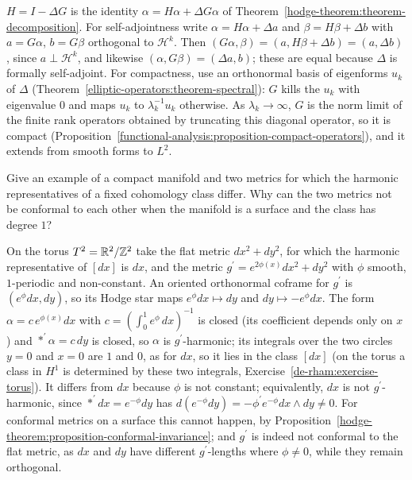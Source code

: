 \begin{solution}
$H = I - \Delta G$ is the identity $\alpha = H\alpha + \Delta G\alpha$ of Theorem~\ref{hodge-theorem:theorem-decomposition}. For self-adjointness write $\alpha = H\alpha + \Delta a$ and $\beta = H\beta + \Delta b$
with $a = G\alpha$, $b = G\beta$ orthogonal to $\mathcal{H}^k$. Then $(G\alpha, \beta) = (a, H\beta + \Delta b) = (a, \Delta b)$, since $a \perp \mathcal{H}^k$, and likewise $(\alpha, G\beta) = (\Delta a, b)$; these are equal because
$\Delta$ is formally self-adjoint. For compactness, use an orthonormal basis of eigenforms $u_k$ of $\Delta$ (Theorem~\ref{elliptic-operators:theorem-spectral}): $G$ kills the $u_k$ with eigenvalue $0$ and maps
$u_k$ to $\lambda_k^{-1}u_k$ otherwise. As $\lambda_k \to \infty$, $G$ is the norm limit of the finite rank operators obtained by truncating this diagonal operator, so it is compact
(Proposition~\ref{functional-analysis:proposition-compact-operators}), and it extends from smooth forms to $L^2$.
\end{solution}

\begin{exercise}\label{hodge-theorem:exercise-harmonic-not-metric-independent}
Give an example of a compact manifold and two metrics for which the harmonic representatives of a fixed cohomology class differ. Why can the two metrics not be conformal to each other when the
manifold is a surface and the class has degree $1$?
\end{exercise}

\begin{solution}
On the torus $T^2 = \mathbb{R}^2/\mathbb{Z}^2$ take the flat metric $dx^2 + dy^2$, for which the harmonic representative of $[dx]$ is $dx$, and the metric $g^{\prime} = e^{2\phi(x)}dx^2 + dy^2$ with $\phi$ smooth,
$1$-periodic and non-constant. An oriented orthonormal coframe for $g^{\prime}$ is $(e^\phi dx, dy)$, so its Hodge star maps $e^\phi dx \mapsto dy$ and $dy \mapsto -e^\phi dx$. The form
$\alpha = c\,e^{\phi(x)}dx$ with $c = (\int_0^1e^\phi\,dx)^{-1}$ is closed (its coefficient depends only on $x$) and $*^{\prime}\alpha = c\,dy$ is closed, so $\alpha$ is $g^{\prime}$-harmonic; its integrals over the
two circles $y = 0$ and $x = 0$ are $1$ and $0$, as for $dx$, so it lies in the class $[dx]$ (on the torus a class in $H^1$ is determined by these two integrals, Exercise~\ref{de-rham:exercise-torus}).
It differs from $dx$ because $\phi$ is not constant; equivalently, $dx$ is not $g^{\prime}$-harmonic, since $*^{\prime}dx = e^{-\phi}dy$ has $d(e^{-\phi}dy) = -\phi^{\prime}e^{-\phi}dx \wedge dy \neq 0$. For conformal metrics on a
surface this cannot happen, by Proposition~\ref{hodge-theorem:proposition-conformal-invariance}; and $g^{\prime}$ is indeed not conformal to the flat metric, as $dx$ and $dy$ have different $g^{\prime}$-lengths where
$\phi \neq 0$, while they remain orthogonal.
\end{solution}

